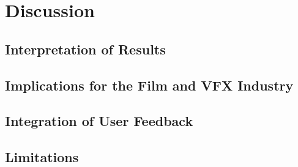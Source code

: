 %
\chapter{Discussion}
\label{sec:discussion}



\section{Interpretation of Results}
\label{sec:discussion:results}

\section{Implications for the Film and VFX Industry}
\label{sec:discussion:implications}

\section{Integration of User Feedback}
\label{sec:discussion:user-feedback}

\section{Limitations}
\label{sec:discussion:limitations}
